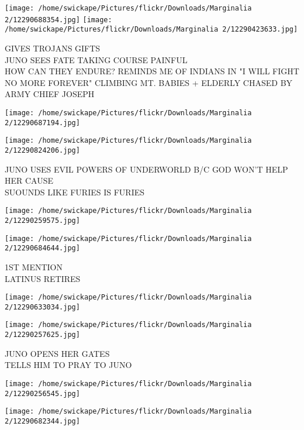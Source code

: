 \documentclass[10pt,letterpaper]{article}
\begin{document}
\vspace{0.25in}
\texttt{[image: /home/swickape/Pictures/flickr/Downloads/Marginalia 2/12290688354.jpg]}
\texttt{[image: /home/swickape/Pictures/flickr/Downloads/Marginalia 2/12290423633.jpg]}

GIVES TROJANS GIFTS\\
JUNO SEES FATE TAKING COURSE PAINFUL\\
HOW CAN THEY ENDURE?  REMINDS ME OF INDIANS IN "I WILL FIGHT NO MORE FOREVER" CLIMBING MT. BABIES + ELDERLY CHASED BY ARMY CHIEF JOSEPH\\
\pagebreak

\texttt{[image: /home/swickape/Pictures/flickr/Downloads/Marginalia 2/12290687194.jpg]}

\vspace{0.25in}
\texttt{[image: /home/swickape/Pictures/flickr/Downloads/Marginalia 2/12290824206.jpg]}

JUNO USES EVIL POWERS OF UNDERWORLD B/C GOD WON'T HELP HER CAUSE\\
SUOUNDS LIKE FURIES IS FURIES\\
\pagebreak

\texttt{[image: /home/swickape/Pictures/flickr/Downloads/Marginalia 2/12290259575.jpg]}

\vspace{0.25in}
\texttt{[image: /home/swickape/Pictures/flickr/Downloads/Marginalia 2/12290684644.jpg]}

1ST MENTION\\
LATINUS RETIRES\\
\pagebreak

\texttt{[image: /home/swickape/Pictures/flickr/Downloads/Marginalia 2/12290633034.jpg]}

\vspace{0.25in}
\texttt{[image: /home/swickape/Pictures/flickr/Downloads/Marginalia 2/12290257625.jpg]}

JUNO OPENS HER GATES\\
TELLS HIM TO PRAY TO JUNO\\
\pagebreak

\texttt{[image: /home/swickape/Pictures/flickr/Downloads/Marginalia 2/12290256545.jpg]}

\vspace{0.25in}
\texttt{[image: /home/swickape/Pictures/flickr/Downloads/Marginalia 2/12290682344.jpg]}
\end{document}
